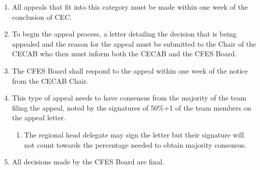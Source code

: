 \begin{enumerate}
 \item
  All appeals that fit into this category must be made within one week of the conclusion of CEC.
 \item
  To begin the appeal process, a letter detailing the decision that is being appealed and the reason for the appeal must be submitted to the Chair of the CECAB who then must inform both the CECAB and the CFES Board.
 \item
  The CFES Board shall respond to the appeal within one week of the notice from the CECAB Chair.
 \item
  This type of appeal needs to have consensus from the majority of the team filing the appeal, noted by the signatures of 50\%+1 of the team members on the appeal letter.

  \begin{enumerate}
   \item
    The regional head delegate may sign the letter but their signature will not count towards the percentage needed to obtain majority consensus.
  \end{enumerate}

 \item
  All decisions made by the CFES Board are final.
\end{enumerate}
